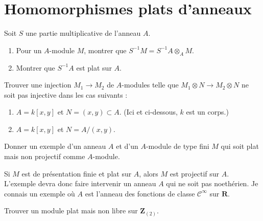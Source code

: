 \section{Homomorphismes plats d'anneaux}
\label{section-flat}

\begin{exercise}
\label{exercise-localization-flat}
Soit $S$ une partie multiplicative de l'anneau $A$.
\begin{enumerate}
\item Pour un $A$-module $M$, montrer que $S^{-1}M = S^{-1}A \otimes_A M$.
\item Montrer que $S^{-1}A$ est plat sur $A$.
\end{enumerate}
\end{exercise}

\begin{exercise}
\label{exercise-examples-not-flat}
Trouver une injection $M_1 \to M_2$ de $A$-modules telle que
$M_1\otimes N \to M_2 \otimes N$ ne soit pas injective dans les
cas suivants :
\begin{enumerate}
\item $A = k[x, y]$ et $N = (x, y) \subset A$. (Ici et ci-dessous, $k$ est un corps.)
\item $A = k[x, y]$ et $N = A/(x, y)$.
\end{enumerate}
\end{exercise}

\begin{exercise}
\label{exercise-flat-not-projective}
Donner un exemple d'un anneau $A$ et d'un $A$-module de type fini $M$
qui soit plat mais non projectif comme $A$-module.
\end{exercise}

\begin{remark}
\label{remark-flat-not-projective}
Si $M$ est de présentation finie et plat sur $A$,
alors $M$ est projectif sur $A$. L'exemple devra donc faire
intervenir un anneau $A$ qui ne soit pas noethérien. Je connais un exemple
où $A$ est l'anneau des fonctions de classe ${\mathcal C}^\infty$ sur ${\mathbf R}$.
\end{remark}

\begin{exercise}
\label{exercise-flat-not-free-dvr}
Trouver un module plat mais non libre sur ${\mathbf Z}_{(2)}$.
\end{exercise}

